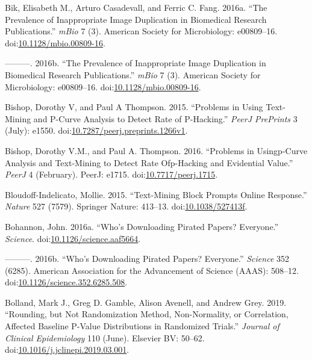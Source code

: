 \documentclass[a5paper]{book}
\begin{document}
\hypertarget{ref-doi:10.1128ux2fmbio.00809-16}{}
Bik, Elisabeth M., Arturo Casadevall, and Ferric C. Fang. 2016a. ``The
Prevalence of Inappropriate Image Duplication in Biomedical Research
Publications.'' \emph{mBio} 7 (3). American Society for Microbiology:
e00809--16.
doi:\href{https://doi.org/10.1128/mbio.00809-16}{10.1128/mbio.00809-16}.

\hypertarget{ref-doi:10.1128ux2fmBio.00809-16}{}
---------. 2016b. ``The Prevalence of Inappropriate Image Duplication in
Biomedical Research Publications.'' \emph{mBio} 7 (3). American Society
for Microbiology: e00809--16.
doi:\href{https://doi.org/10.1128/mbio.00809-16}{10.1128/mbio.00809-16}.

\hypertarget{ref-doi:10.7287ux2fpeerj.preprints.1266v1}{}
Bishop, Dorothy V, and Paul A Thompson. 2015. ``Problems in Using
Text-Mining and P-Curve Analysis to Detect Rate of P-Hacking.''
\emph{PeerJ PrePrints} 3 (July): e1550.
doi:\href{https://doi.org/10.7287/peerj.preprints.1266v1}{10.7287/peerj.preprints.1266v1}.

\hypertarget{ref-doi:10.7717ux2fpeerj.1715}{}
Bishop, Dorothy V.M., and Paul A. Thompson. 2016. ``Problems in
Usingp-Curve Analysis and Text-Mining to Detect Rate Ofp-Hacking and
Evidential Value.'' \emph{PeerJ} 4 (February). PeerJ: e1715.
doi:\href{https://doi.org/10.7717/peerj.1715}{10.7717/peerj.1715}.

\hypertarget{ref-doi:10.1038ux2f527413f}{}
Bloudoff-Indelicato, Mollie. 2015. ``Text-Mining Block Prompts Online
Response.'' \emph{Nature} 527 (7579). Springer Nature: 413--13.
doi:\href{https://doi.org/10.1038/527413f}{10.1038/527413f}.

\hypertarget{ref-doi:10.1126ux2fscience.aaf5664}{}
Bohannon, John. 2016a. ``Who's Downloading Pirated Papers? Everyone.''
\emph{Science}.
doi:\href{https://doi.org/10.1126/science.aaf5664}{10.1126/science.aaf5664}.

\hypertarget{ref-doi:10.1126ux2fscience.352.6285.508}{}
---------. 2016b. ``Who's Downloading Pirated Papers? Everyone.''
\emph{Science} 352 (6285). American Association for the Advancement of
Science (AAAS): 508--12.
doi:\href{https://doi.org/10.1126/science.352.6285.508}{10.1126/science.352.6285.508}.

\hypertarget{ref-doi:10.1016ux2fj.jclinepi.2019.03.001}{}
Bolland, Mark J., Greg D. Gamble, Alison Avenell, and Andrew Grey. 2019.
``Rounding, but Not Randomization Method, Non-Normality, or Correlation,
Affected Baseline P-Value Distributions in Randomized Trials.''
\emph{Journal of Clinical Epidemiology} 110 (June). Elsevier BV: 50--62.
doi:\href{https://doi.org/10.1016/j.jclinepi.2019.03.001}{10.1016/j.jclinepi.2019.03.001}.
\end{document}
